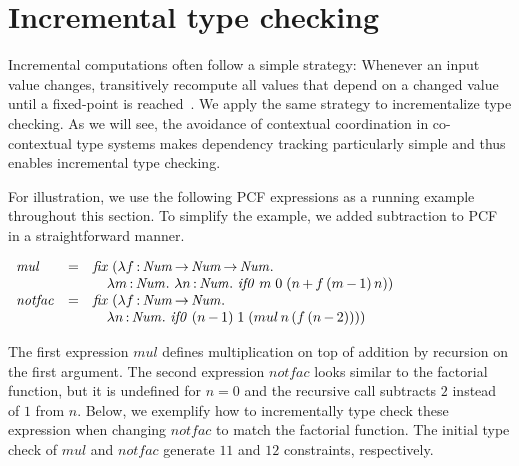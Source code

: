 \documentclass{llncs}
\begin{document}
\section{Incremental type checking}
\label{sec:incremental}

Incremental computations often follow a simple strategy: Whenever an input value
changes, transitively recompute all values that depend on a changed value until
a fixed-point is reached~\cite{MitschkeEKMS14}. We apply the same strategy to
incrementalize type checking. As we will see, the avoidance of contextual
coordination in co-contextual type systems makes dependency tracking
particularly simple and thus enables incremental type checking.

For illustration, we use the following PCF expressions as a running example
throughout this section. To simplify the example, we added subtraction to PCF in
a straightforward manner.

\vspace{1ex}
$
\begin{array}{lcl}
  \mathit{mul} &=& \mathit{fix}\; (\lambda f \mathop{:} \mathit{Num} \mathop{\rightarrow} \mathit{Num} \mathop{\rightarrow} \mathit{Num}.\ \\&&\quad
                   \lambda m \mathop{:} \mathit{Num}.\ \lambda n \mathop{:} \mathit{Num}.\  
                     \mathit{if0}\; m\; 0\; (n \mathop{+} f\, (m \mathop{-} 1)\, n)) \\
  \mathit{notfac} &=& \mathit{fix}\; (\lambda f \mathop{:} \mathit{Num} \mathop{\rightarrow} \mathit{Num}.\ \\&&\quad
                   \lambda n \mathop{:} \mathit{Num}.\ \mathit{if0}\; (n \mathop{-} 1)\; 1\; (mul\, n\, (f\, (n \mathop{-} 2)))) \\
\end{array}
$
\vspace{1ex}

\noindent The first expression $\mathit{mul}$ defines multiplication on top of addition by
recursion on the first argument. The second expression $\mathit{notfac}$ looks
similar to the factorial function, but it is undefined for $n = 0$ and the
recursive call subtracts $2$ instead of $1$ from $n$. Below, we exemplify how to
incrementally type check these expression when changing $\mathit{notfac}$ to
match the factorial function. The initial type check of $\mathit{mul}$ and
$\mathit{notfac}$ generate $11$ and $12$ constraints, respectively.
\end{document}
